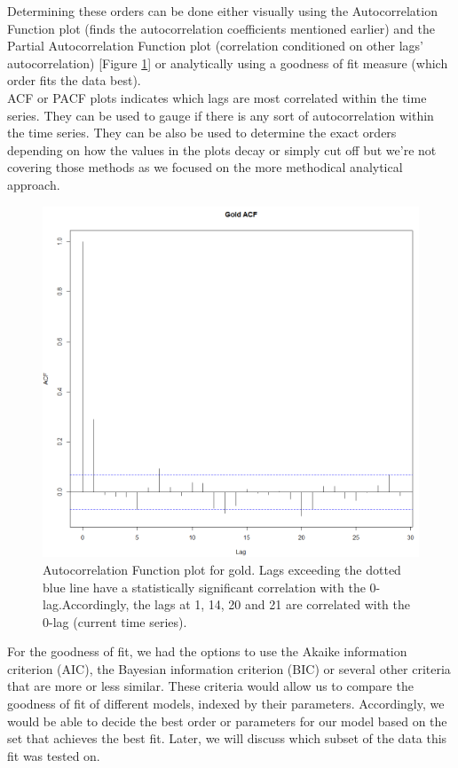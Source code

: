 Determining these orders can be done either visually using the Autocorrelation Function plot (finds the autocorrelation coefficients mentioned earlier) and the Partial Autocorrelation Function plot (correlation conditioned on other lags' autocorrelation) [Figure \ref{fig:ACF}] or analytically using a goodness of fit measure (which order fits the data best).\\
ACF or PACF plots indicates which lags are most correlated within the time series. They can be used to gauge if there is any sort of autocorrelation within the time series. They can be also be used to determine the exact orders depending on how the values in the plots decay or simply cut off but we're not covering those methods as we focused on the more methodical analytical approach.\\
\begin{figure}[ht]
	\vskip 0.2in
	\begin{center}
		\centerline{\includegraphics[width=\columnwidth]{ACF.PNG}}
		\caption{Autocorrelation Function plot for gold. Lags exceeding the dotted blue line have a statistically significant correlation with the 0-lag.Accordingly, the lags at 1, 14, 20 and 21 are correlated with the 0-lag (current time series).}
	\end{center}
	\vskip -0.2in
	\label{fig:ACF}
\end{figure}
For the goodness of fit, we had the options to use the Akaike information criterion (AIC), the Bayesian information criterion (BIC) or several other criteria that are more or less similar. These criteria would allow us to compare the goodness of fit of different models, indexed by their parameters. Accordingly, we would be able to decide the best order or parameters for our model based on the set that achieves the best fit. Later, we will discuss which subset of the data this fit was tested on.\\
